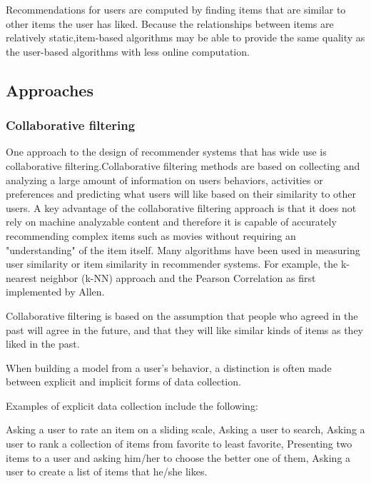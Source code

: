 \documentclass[paper=a4, fontsize=11pt]{scrartcl}
\numberwithin{equation}{section}		%
\numberwithin{figure}{section}			%
\numberwithin{table}{section}				%
\begin{document}
Recommendations for users are computed by finding items that are similar to other items the user has liked. Because the relationships between items are relatively static,item-based algorithms may be able to provide the same quality as the user-based algorithms with less online computation.

\subsection{Approaches}

\subsubsection{Collaborative filtering}

One approach to the design of recommender systems that has wide use is collaborative filtering.Collaborative filtering methods are based on collecting and analyzing a large amount of information on users behaviors, activities or preferences and predicting what users will like based on their similarity to other users. A key advantage of the collaborative filtering approach is that it does not rely on machine analyzable content and therefore it is capable of accurately recommending complex items such as movies without requiring an "understanding" of the item itself. Many algorithms have been used in measuring user similarity or item similarity in recommender systems. For example, the k-nearest neighbor (k-NN) approach and the Pearson Correlation as first implemented by Allen.

Collaborative filtering is based on the assumption that people who agreed in the past will agree in the future, and that they will like similar kinds of items as they liked in the past.

When building a model from a user's behavior, a distinction is often made between explicit and implicit forms of data collection.

Examples of explicit data collection include the following:

Asking a user to rate an item on a sliding scale,
Asking a user to search,
Asking a user to rank a collection of items from favorite to least favorite,
Presenting two items to a user and asking him/her to choose the better one of them,
Asking a user to create a list of items that he/she likes.
\end{document}
